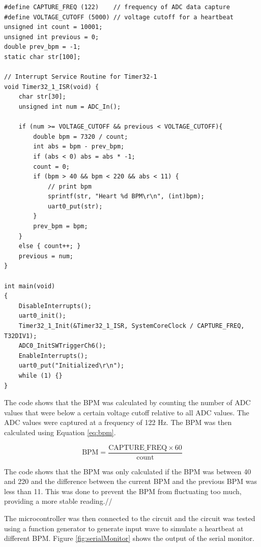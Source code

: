 \documentclass[CMPE]{KGCOEReport}
\begin{document}
\begin{verbatim}
#define CAPTURE_FREQ (122)    // frequency of ADC data capture
#define VOLTAGE_CUTOFF (5000) // voltage cutoff for a heartbeat
unsigned int count = 10001;
unsigned int previous = 0;
double prev_bpm = -1;
static char str[100];

// Interrupt Service Routine for Timer32-1
void Timer32_1_ISR(void) {
    char str[30];
    unsigned int num = ADC_In();

    if (num >= VOLTAGE_CUTOFF && previous < VOLTAGE_CUTOFF){
        double bpm = 7320 / count;
        int abs = bpm - prev_bpm;
        if (abs < 0) abs = abs * -1;
        count = 0;
        if (bpm > 40 && bpm < 220 && abs < 11) {
            // print bpm
            sprintf(str, "Heart %d BPM\r\n", (int)bpm);
            uart0_put(str);
        }
        prev_bpm = bpm;
    }
    else { count++; }
    previous = num;
}

int main(void)
{
    DisableInterrupts();
    uart0_init();
    Timer32_1_Init(&Timer32_1_ISR, SystemCoreClock / CAPTURE_FREQ, T32DIV1);
    ADC0_InitSWTriggerCh6();
    EnableInterrupts();
    uart0_put("Initialized\r\n");
    while (1) {}
}
\end{verbatim}

The code shows that the BPM was calculated by counting the number of ADC values that were below a certain voltage cutoff relative to all ADC values. The ADC values were captured at a frequency of 122 Hz. The BPM was then calculated using Equation \ref{eq:bpm}.

\begin{equation}
\text{BPM} = \frac{\text{CAPTURE\_FREQ} \times 60}{\text{count}} \label{eq:bpm}
\end{equation}

The code shows that the BPM was only calculated if the BPM was between 40 and 220 and the difference between the current BPM and the previous BPM was less than 11. This was done to prevent the BPM from fluctuating too much, providing a more stable reading.//

The microcontroller was then connected to the circuit and the circuit was tested using a function generator to generate input wave to simulate a heartbeat at different BPM. Figure \ref{fig:serialMonitor} shows the output of the serial monitor.
\end{document}
